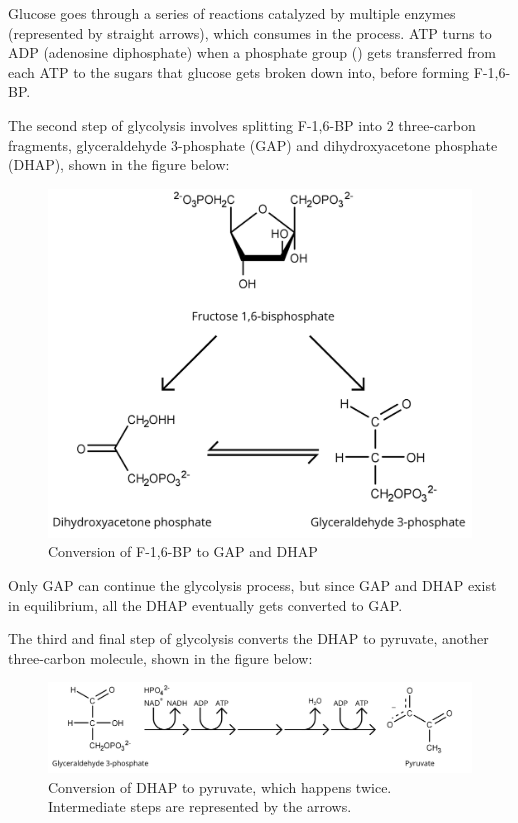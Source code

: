 \documentclass{article}
\begin{document}
Glucose goes through a series of reactions catalyzed by multiple enzymes (represented by straight arrows), which consumes  in the process. ATP turns to ADP (adenosine diphosphate) when a phosphate group () gets transferred from each ATP to the sugars that glucose gets broken down into, before forming F-1,6-BP.

\medskip

The second step of glycolysis involves splitting F-1,6-BP into 2 three-carbon fragments, glyceraldehyde 3-phosphate (GAP) and dihydroxyacetone phosphate (DHAP), shown in the figure below:
\begin{figure}[H]
    \centering
    \includegraphics[width=0.55\linewidth]{figures/figure_02.png}
    \caption{Conversion of F-1,6-BP to GAP and DHAP}
    \label{fig:figure2}
\end{figure}

Only GAP can continue the glycolysis process, but since GAP and DHAP exist in equilibrium, all the DHAP eventually gets converted to GAP.

\newpage

The third and final step of glycolysis converts the DHAP to pyruvate, another three-carbon molecule, shown in the figure below:
\begin{figure}[H]
    \centering
    \includegraphics[width=0.886\linewidth]{figures/figure_03.png}
    \caption{Conversion of DHAP to pyruvate, which happens twice. Intermediate steps are represented by the arrows.}
    \label{fig:figure3}
\end{figure}
\end{document}
